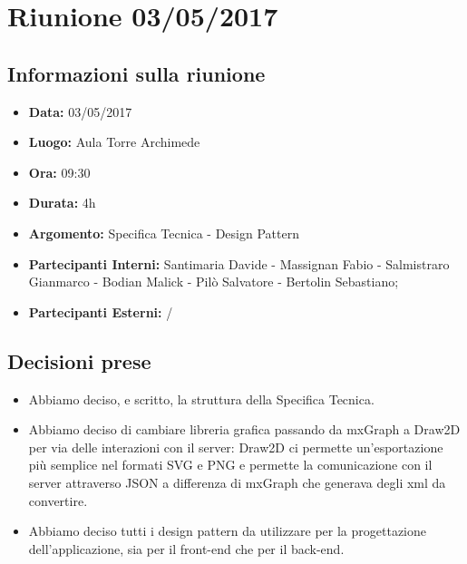 \section{Riunione 03/05/2017}
  \subsection{Informazioni sulla riunione}
    \begin{itemize}
      \item \textbf{Data: }03/05/2017
      \item \textbf{Luogo: }Aula Torre Archimede
      \item \textbf{Ora: }09:30
      \item \textbf{Durata: }4h
      \item \textbf{Argomento: }Specifica Tecnica - Design Pattern
      \item \textbf{Partecipanti Interni: }Santimaria Davide - Massignan Fabio - Salmistraro Gianmarco - Bodian Malick - Pilò Salvatore - Bertolin Sebastiano;
      \item \textbf{Partecipanti Esterni: }/
    \end{itemize}
  \subsection{Decisioni prese}
		\begin{itemize}
			\item Abbiamo deciso, e scritto, la struttura della Specifica Tecnica.
      \item Abbiamo deciso di cambiare libreria grafica passando da mxGraph a Draw2D per via delle interazioni con il server: Draw2D ci permette un'esportazione più semplice
      nel formati SVG e PNG e permette la comunicazione con il server attraverso JSON a differenza di mxGraph che generava degli xml da convertire.
      \item Abbiamo deciso tutti i design pattern da utilizzare per la progettazione dell'applicazione, sia per il front-end che per il back-end.
		\end{itemize}
